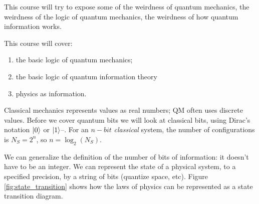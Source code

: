 \documentclass[]{article}
\begin{document}
This course will try to expose some of the weirdness of quantum mechanics, the weirdness of the logic of quantum mechanics, the weirdness of how quantum information works. 

This course will cover:
\begin{enumerate}
	\item the basic logic of quantum mechanics;
	\item the basic logic of quantum information theory
	\item physics as information.
\end{enumerate}

Classical mechanics represents values as real numbers; QM often uses discrete values. Before we cover quantum bits we will look at classical bits, using Dirac's notation $\ket{0}$ or $\ket{1}$--\cite{susskind2014quantum}. For an $n-bit$ \emph{classical} system, the number of configurations is $N_S=2^n$, so $n=\log_2(N_S)$.

We can generalize the definition of the number of bits of information: it doesn't have to be an integer. We can represent the state of a physical system, to a specified precision, by a string of bits (quantize space, etc). Figure \ref{fig:state_transition} shows how the laws of physics can be represented as a state transition diagram.
\end{document}
